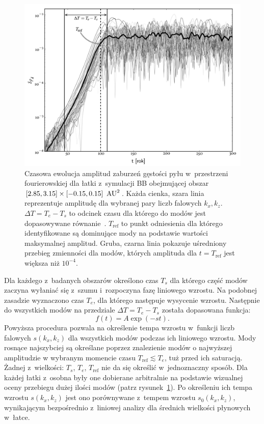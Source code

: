 \begin{figure}
  \includegraphics[width=0.98\linewidth]{figures/fig7}

  \caption[Ewolucja amplitud zaburzeń gęstości w~symulacji BB.]
    {Czasowa ewolucja amplitud zaburzeń gęstości pyłu w~przestrzeni
     fourierowskiej dla łatki z~symulacji BB obejmującej obszar 
     $[2.85,3.15]\times[-0.15,0.15]~\hbox{$\thinspace\textrm{AU}$}^2$. Każda cienka, szara linia
     reprezentuje amplitudę dla wybranej pary liczb falowych $k_x, k_z$.
     $\Delta T = T_e - T_s$ to odcinek czasu dla którego do modów jest
     dopasowywane równanie~. $T_{\textrm{ref}}$ to punkt
     odniesienia dla którego identyfikowane są dominujące mody na podstawie
     wartości maksymalnej amplitud. Gruba, czarna linia pokazuje uśredniony
     przebieg zmienności dla modów, których amplituda dla $t = T_{\textrm{ref}}$
     jest większa niż $10^{-4}$.} 
   \label{fig7} 
\end{figure}

Dla każdego z~badanych obszarów określono czas $T_s$ dla którego część modów
zaczyna wyłaniać się z~szumu i~rozpoczyna fazę liniowego wzrostu. Na
podobnej zasadzie wyznaczono czas $T_e$, dla którego następuje wysycenie
wzrostu. Następnie do wszystkich modów na przedziale $\Delta T = T_e - T_s$
została dopasowana funkcja:
%
\begin{equation}
   f(t) = A\exp\left(-s t\right).
   \label{eq:fit}
\end{equation}
%
Powyższa procedura pozwala na określenie tempa wzrostu w~funkcji liczb falowych
$s(k_x, k_z)$ dla wszystkich modów podczas ich liniowego wzrostu. Mody rosnące
najszybciej są określane poprzez znalezienie modów o najwyższej amplitudzie w
wybranym momencie czasu $T_{\textrm{ref}} \lesssim T_e$, tuż przed ich
saturacją. Żadnej z~wielkości: $T_s$, $T_e$, $T_{\textrm{ref}}$ nie da się
określić w~jednoznaczny sposób. Dla każdej łatki z~osobna były one dobierane
arbitralnie na podstawie wizualnej oceny przebiegu dużej ilości modów (patrz
rysunek~\ref{fig7}).  Po określeniu ich tempa wzrostu $s(k_x, k_z)$ jest ono
porównywane z~tempem wzrostu $s_0(k_x, k_z)$, wynikającym bezpośrednio z~liniowej
analizy dla średnich wielkości płynowych w~łatce.

